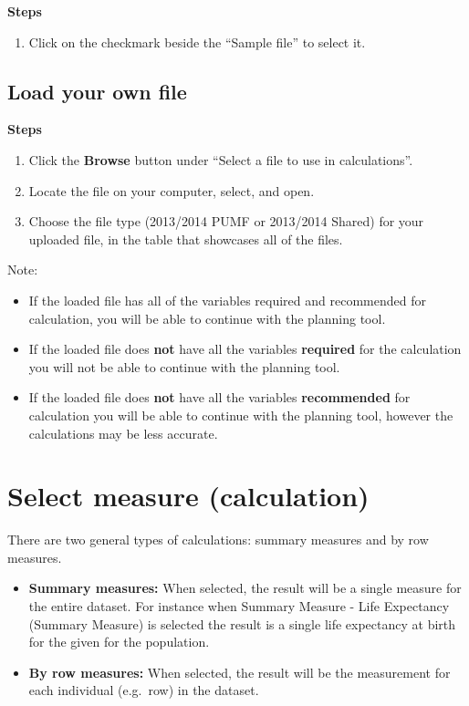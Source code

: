 \documentclass[]{book}
\providecommand{\tightlist}{%
  \setlength{\itemsep}{0pt}\setlength{\parskip}{0pt}}
\begin{document}
\textbf{Steps}

\begin{enumerate}
\def\labelenumi{\arabic{enumi}.}
\tightlist
\item
  Click on the checkmark beside the ``Sample file'' to select it.
\end{enumerate}

\hypertarget{load-your-own-file}{%
\subsection{Load your own file}\label{load-your-own-file}}

\textbf{Steps}

\begin{enumerate}
\def\labelenumi{\arabic{enumi}.}
\item
  Click the \textbf{Browse} button under ``Select a file to use in calculations''.
\item
  Locate the file on your computer, select, and open.
\item
  Choose the file type (2013/2014 PUMF or 2013/2014 Shared) for your uploaded file, in the table that showcases all of the files.
\end{enumerate}

Note:

\begin{itemize}
\item
  If the loaded file has all of the variables required and recommended for calculation, you will be able to continue with the planning tool.
\item
  If the loaded file does \textbf{not} have all the variables \textbf{required} for the calculation you will not be able to continue with the planning tool.
\item
  If the loaded file does \textbf{not} have all the variables \textbf{recommended} for calculation you will be able to continue with the planning tool, however the calculations may be less accurate.
\end{itemize}

\hypertarget{select-measure-calculation}{%
\section{Select measure (calculation)}\label{select-measure-calculation}}

There are two general types of calculations: summary measures and by row measures.

\begin{itemize}
\item
  \textbf{Summary measures:} When selected, the result will be a single measure for the entire dataset. For instance when Summary Measure - Life Expectancy (Summary Measure) is selected the result is a single life expectancy at birth for the given for the population.
\item
  \textbf{By row measures:} When selected, the result will be the measurement for each individual (e.g.~row) in the dataset.
\end{itemize}
\end{document}
